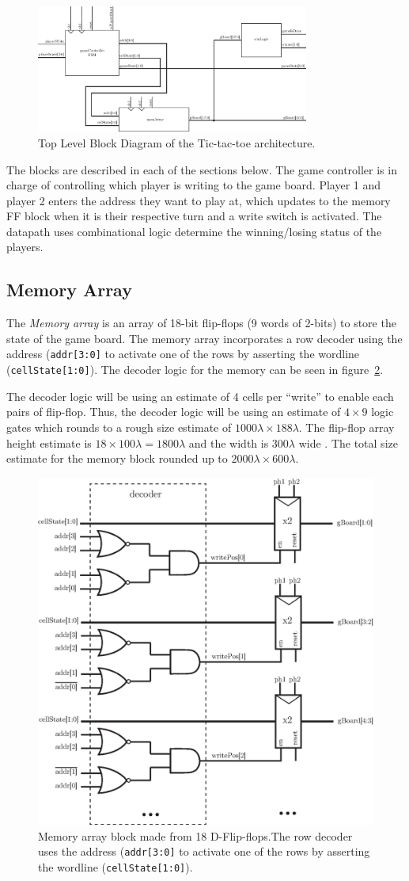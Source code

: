\documentclass[]{article}
\begin{document}
\begin{figure}
\centering
\includegraphics[width=0.8\textwidth]{top-level}
\caption{Top Level Block Diagram of the Tic-tac-toe architecture.}
\label{fig:top-level}
\end{figure}
The blocks are described in each of the sections below. The game controller is in charge of controlling which player is writing to the game board. Player 1 and player 2 enters the address they want to play at, which updates to the memory FF block when it is their respective turn and a write switch is activated. The datapath uses combinational logic determine the winning/losing status of the players.

\subsection{Memory Array}
The \emph{Memory array} is an array of 18-bit flip-flops (9 words of 2-bits) to store the state of the game board. The memory array incorporates a row decoder using the address (\texttt{addr[3:0]} to activate one of the rows by asserting the wordline (\texttt{cellState[1:0]}). The decoder logic for the memory can be seen in figure~\ref{fig:memArray}.

The decoder logic will be using an estimate of 4 cells per ``write'' to enable each pairs of flip-flop. Thus, the decoder logic will be using an estimate of $4\times 9$ logic gates which rounds to a rough size estimate of  $ 1000\lambda \times 188 \lambda$. The flip-flop array height estimate is $18 \times 100\lambda = 1800\lambda$ and the width is $300\lambda$ wide . The total size estimate for the memory block rounded up to $2000 \lambda \times 600 \lambda$.
\begin{figure}
\centering
\includegraphics[width=.45\textwidth]{memArray}
\caption{Memory array block made from 18 D-Flip-flops.The row decoder uses the address (\texttt{addr[3:0]} to activate one of the rows by asserting the wordline (\texttt{cellState[1:0]}). }
\label{fig:memArray}
\end{figure}
\end{document}
